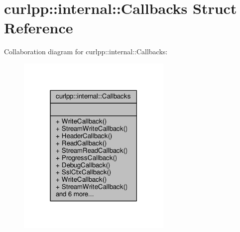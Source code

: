 \hypertarget{structcurlpp_1_1internal_1_1Callbacks}{\section{curlpp\-:\-:internal\-:\-:Callbacks Struct Reference}
\label{structcurlpp_1_1internal_1_1Callbacks}
}


Collaboration diagram for curlpp\-:\-:internal\-:\-:Callbacks\-:
\nopagebreak
\begin{figure}[H]
\begin{center}
\leavevmode
\includegraphics[width=210pt]{structcurlpp_1_1internal_1_1Callbacks__coll__graph}
\end{center}
\end{figure}
